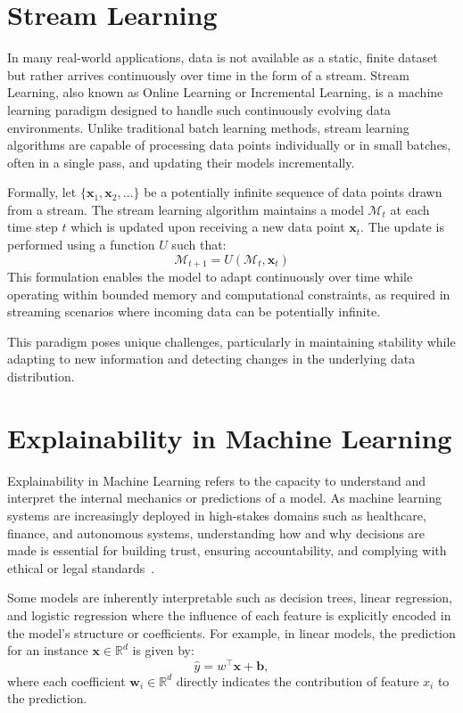 \section{Stream Learning}\label{sec:stream_learning}
In many real-world applications, data is not available as a static, finite
dataset but rather arrives continuously over time in the form of a stream.
Stream Learning, also known as Online Learning or Incremental Learning, is a
machine learning paradigm designed to handle such continuously evolving data
environments. Unlike traditional batch learning methods, stream learning
algorithms are capable of processing data points individually or in small
batches, often in a single pass, and updating their models incrementally.

Formally, let $\{\mathbf{x}_1, \mathbf{x}_2,\ldots \} $ be a potentially
infinite sequence of data points drawn from a stream. The stream learning
algorithm maintains a model $\mathcal{M}_t$ at each time step $t$ which is
updated upon receiving a new data point $\mathbf{x}_t$. The update is performed
using a function $U$ such that:
\begin{equation}
    \mathcal{M}_{t+1} = U(\mathcal{M}_t, \mathbf{x}_t)
\end{equation}
This formulation enables the model to adapt continuously over time while
operating within bounded memory and computational constraints, as required
in streaming scenarios where incoming data can be potentially infinite.

This paradigm poses unique challenges, particularly in maintaining stability
while adapting to new information and detecting changes in the underlying data
distribution.

\section{Explainability in Machine Learning}\label{sec:explainability}

Explainability in Machine Learning refers to the capacity to understand and
interpret the internal mechanics or predictions of a model. As machine learning
systems are increasingly deployed in high-stakes domains such as healthcare,
finance, and autonomous systems, understanding how and why decisions are made
is essential for building trust, ensuring accountability, and complying with
ethical or legal standards~\cite{importance_of_explainabilty}.

Some models are inherently interpretable such as decision trees, linear
regression, and logistic regression where the influence of each feature is
explicitly encoded in the model's structure or coefficients. For example, in
linear models, the prediction for an instance $\mathbf{x} \in \mathbb{R}^d$ is
given by:
\begin{equation}
    \hat{y} = w^\top \mathbf{x} + \mathbf{b},
\end{equation}
where each coefficient $\mathbf{w}_i \in \mathbb{R}^d$ directly indicates the contribution of feature
$x_i$ to the prediction.

